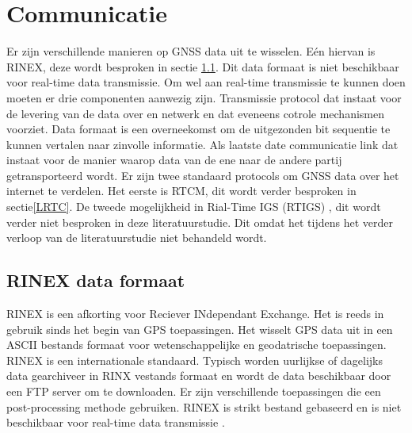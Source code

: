 \section{Communicatie}
\label{LCom}
Er zijn verschillende manieren op GNSS data uit te wisselen. E\'en hiervan is RINEX, deze wordt besproken in sectie \ref{LRin}. Dit data formaat is niet beschikbaar voor real-time data transmissie. Om wel aan real-time transmissie te kunnen doen moeten er drie componenten aanwezig zijn. Transmissie protocol dat instaat voor de levering van de data over en netwerk en dat eveneens cotrole mechanismen voorziet. Data formaat is een overneekomst om de uitgezonden bit sequentie te kunnen vertalen naar zinvolle informatie. Als laatste date communicatie link dat instaat voor de manier waarop data van de ene naar de andere partij getransporteerd wordt. Er zijn twee standaard protocols om GNSS data over het internet te verdelen. Het eerste is RTCM, dit wordt verder besproken in sectie\ref{LRTC}. De tweede mogelijkheid in Rial-Time IGS (RTIGS) \cite{LBibRTCM}, dit wordt verder niet besproken in deze literatuurstudie. Dit omdat het tijdens het verder verloop van de literatuurstudie niet behandeld wordt.


\subsection{RINEX data formaat}
\label{LRin}
RINEX is een afkorting voor Reciever INdependant Exchange. Het is reeds in gebruik sinds het begin van GPS toepassingen. Het wisselt GPS data uit in een ASCII bestands formaat voor wetenschappelijke en geodatrische toepassingen. RINEX is een internationale standaard. Typisch worden uurlijkse of dagelijks data gearchiveer in RINX vestands formaat en wordt de data beschikbaar door een FTP server om te downloaden. Er zijn verschillende toepassingen die een post-processing methode gebruiken. RINEX is strikt bestand gebaseerd en is niet beschikbaar voor real-time data transmissie \cite{LBibRTCM}. 

